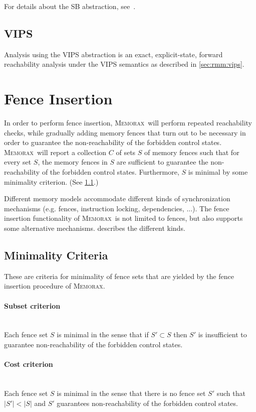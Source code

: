 \documentclass[a4paper]{article}
\newcommand{\memorax}{\textsc{Memorax}}
\begin{document}
For details about the SB abstraction, see~\cite{AACLR12}.

\subsection{VIPS}

Analysis using the VIPS abstraction is an exact, explicit-state,
forward reachability analysis under the VIPS semantics as described in
\cref{sec:rmm:vips}.

\section{Fence Insertion}

In order to perform fence insertion, \memorax\ will perform repeated
reachability checks, while gradually adding memory fences that turn
out to be necessary in order to guarantee the non-reachability of the
forbidden control states. \memorax\ will report a collection $C$ of
sets $S$ of memory fences such that for every set $S$, the memory
fences in $S$ are sufficient to guarantee the non-reachability of the
forbidden control states. Furthermore, $S$ is minimal by some
minimality criterion. (See \cref{sec:min:criteria}.)

Different memory models accommodate different kinds of synchronization
mechanisms (e.g. fences, instruction locking, dependencies, ...). The
fence insertion functionality of \memorax\ is not limited to fences,
but also supports some alternative mechanisms. 
describes the different kinds.

\subsection{Minimality Criteria}\label{sec:min:criteria}

These are criteria for minimality of fence sets that are yielded by
the fence insertion procedure of \memorax.

\paragraph{Subset criterion}\mbox{}\\
%
Each fence set $S$ is minimal in the sense that if $S'\subset S$ then
$S'$ is insufficient to guarantee non-reachability of the forbidden
control states.

\paragraph{Cost criterion}\mbox{}\\
%
Each fence set $S$ is minimal in the sense that there is no fence set
$S'$ such that $|S'| < |S|$ and $S'$ guarantees non-reachability of
the forbidden control states.
\end{document}
